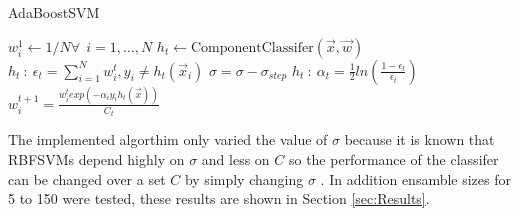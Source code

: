 \begin{algorithm}
\caption{AdaBoostSVM}
\label{algo:AdaBoostSVM}
\begin{algorithmic}[1]
\State $w_{i}^{1} \gets 1/N \forall ~~ i=1,\dots,N$
    \label{marker}
    \State $h_t \gets \text{ComponentClassifer}(\vec{x},\vec{w})$
    \State $h_t~:~\epsilon_t = \sum_{i=1}^{N}w_{i}^{t} , y_i \ne h_t(\vec{x}_i)$
        \State $\sigma = \sigma - \sigma_{step}$
        \State {}
    \EndIf
    \State $h_t~:~\alpha_t = \frac{1}{2} ln\left ( \frac{1-\epsilon_t}{\epsilon_t}\right)$
    \State $w_i^{t+1} = \frac{w_i^{t} exp\left ( -\alpha_i y_i h_t(\vec{x})\right)}{C_t}$
\EndWhile
{}
\EndProcedure
\end{algorithmic}
\end{algorithm}

The implemented algorthim only varied the value of $\sigma$ because it is known that RBFSVMs depend highly on $\sigma$ and less on $C$ so the performance of the classifer can be changed over a set $C$ by simply changing $\sigma$ \cite{li_adaboost_2008}.
In addition ensamble sizes for 5 to 150 were tested, these results are shown in Section \ref{sec:Results}.
